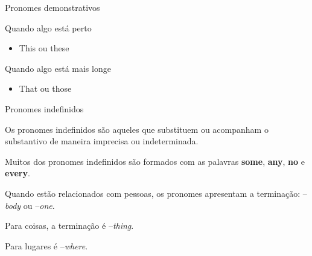 \documentclass[compress,mathserif,xcolor=table]{beamer}
\begin{document}
\begin{frame}{Pronomes demonstrativos}

\begin{table}[]
\centering
\label{tab:my-table4}
\end{table}

\vspace{0.5cm}

\begin{minipage}{.49\textwidth}
Quando algo está perto
\begin{itemize}
    \item This ou these
\end{itemize}
\end{minipage}
\begin{minipage}{.49\textwidth}
Quando algo está mais longe
\begin{itemize}
    \item That ou those
\end{itemize}
\end{minipage}

\end{frame}


\begin{frame}{Pronomes indefinidos}

Os pronomes indefinidos são aqueles que substituem ou acompanham o substantivo de maneira imprecisa ou indeterminada.

\vspace{0.5cm}

Muitos dos pronomes indefinidos são formados com as palavras \textbf{some}, \textbf{any}, \textbf{no} e \textbf{every}.

\vspace{0.5cm}

Quando estão relacionados com pessoas, os pronomes apresentam a terminação: –\textit{body} ou –\textit{one}. 

Para coisas, a terminação é –\textit{thing}. 

Para lugares é –\textit{where}.

\end{frame}
\end{document}
